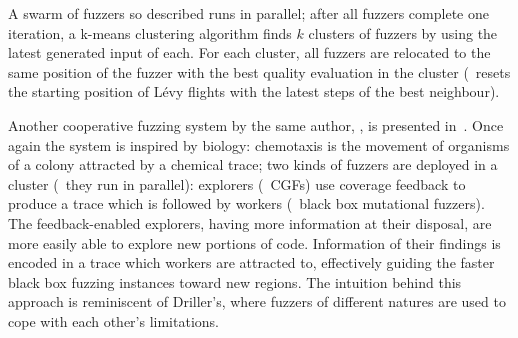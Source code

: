 A swarm of fuzzers so described runs in parallel; after all fuzzers complete one
iteration, a k-means clustering algorithm finds $k$ clusters of fuzzers by using
the latest generated input of each. For each cluster, all fuzzers are relocated
to the same position of the fuzzer with the best quality evaluation in the
cluster (\ie~resets the starting position of L\'evy flights with the latest
steps of the best neighbour).

Another cooperative fuzzing system by the same author,
\citeauthor{bottinger2016fuzzing}, is presented in~\cite{bottinger2017guiding,
bottinger2017chemotactic}. Once again the system is inspired by biology:
chemotaxis is the movement of organisms of a colony attracted by a chemical
trace; two kinds of fuzzers are deployed in a cluster (\ie~they run in
parallel): explorers (\ie~\acp{CGF}) use coverage feedback to produce a trace
which is followed by workers (\ie~black box mutational fuzzers). The
feedback-enabled explorers, having more information at their disposal, are more
easily able to explore new portions of code. Information of their findings is
encoded in a trace which workers are attracted to, effectively guiding the
faster black box fuzzing instances toward new regions. The intuition behind this
approach is reminiscent of Driller's, where fuzzers of different natures are
used to cope with each other's limitations.


